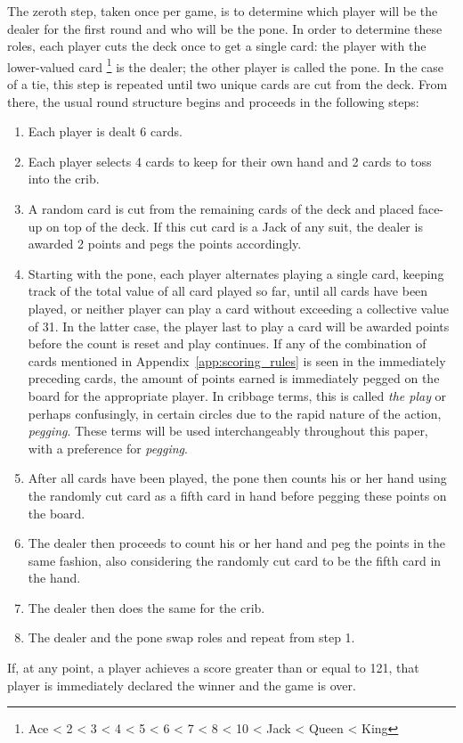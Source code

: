 The zeroth step, taken once per game, is to determine which player will be the
dealer for the first round and who will be the pone.
%
%
In order to determine these roles,
each player cuts the deck once to get a single card:
the player with the lower-valued card%
\footnote{Ace < 2 < 3 < 4 < 5 < 6 < 7 < 8 < 10 < Jack < Queen < King}
is the dealer;
the other player is called the pone.
In the case of a tie, this step is repeated until two unique cards are
cut from the deck.
%
From there, the usual round structure begins and proceeds in the following
steps:
%
\begin{enumerate}
%
\item Each player is dealt 6 cards.
%
\item Each player selects 4 cards to keep for their own hand and 2 cards to
	toss into the crib.
%
\item A random card is cut from the remaining cards of the deck and placed
	face-up on top of the deck.
	If this cut card is a Jack of any suit,
	the dealer is awarded 2 points and pegs the points accordingly.
%
\item Starting with the pone, each player alternates playing a single card,
	keeping track of the total value of all card played so far,
	until all cards have been played,
	or neither player can play a card without exceeding a collective value of
	31.
	In the latter case, the player last to play a card will be awarded points
	before the count is reset and play continues.
	If any of the combination of cards mentioned in
	Appendix~\ref{app:scoring_rules} is seen in the immediately preceding cards,
	the amount of points earned is immediately pegged on the board for the
	appropriate player.
	In cribbage terms, this is called \textit{the play}
	or perhaps confusingly,
	in certain circles due to the rapid nature of the
	action, \textit{pegging}.
	These terms will be used interchangeably throughout this paper,
	with a preference for \textit{pegging}.
%
\item After all cards have been played,
	the pone then counts his or her hand using the randomly cut card as a
	fifth card in hand before pegging these points on the board.
%
\item The dealer then proceeds to count his or her hand and peg the points
	in the same fashion, also considering the randomly cut card to be the
	fifth card in the hand.
%
\item The dealer then does the same for the crib.
%
\item The dealer and the pone swap roles and repeat from step 1.
%
\end{enumerate}
%
If, at any point, a player achieves a score greater than or equal to 121,
that player is immediately declared the winner and the game is over.


